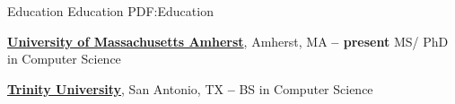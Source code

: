 \Section
{Education}
{Education}
{PDF:Education}

\Entry
\href{https://www.cics.umass.edu/}
{\textbf{University of Massachusetts Amherst}},
Amherst, MA
\dotfill
\textbf{ -- present}
\Gap
MS/ PhD in Computer Science

\BigGap
\Entry
\href{https://new.trinity.edu/academics/departments/computer-science}
{\textbf{Trinity University}},
San Antonio, TX
\dotfill
\textbf{ -- }
\Gap
BS in Computer Science